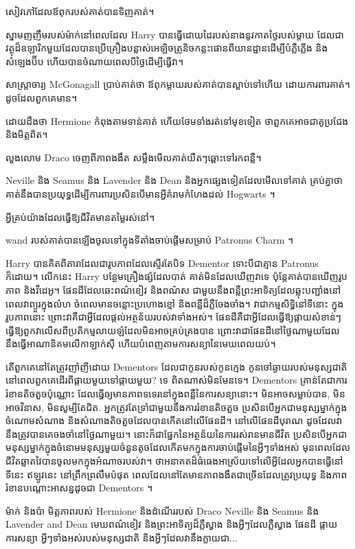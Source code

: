 {សៀវភៅដែលឪពុករបស់គាត់បានទិញគាត់។

ស្នាមញញឹមរបស់ម៉ាក់នៅពេលដែល Harry បានធ្វើដោយដៃរបស់នាងនូវកាតថ្ងៃរបស់ម្តាយ ដែលជាវត្ថុដ៏ឧឡារិកមួយដែលបានប្រើគ្រឿងបន្លាស់អេឡិចត្រូនិចកន្លះផោនពីយានដ្ឋានដើម្បីបំភ្លឺភ្លើង និងសំឡេងប៊ីប ហើយបានចំណាយពេលបីថ្ងៃដើម្បីធ្វើវា។

សាស្ត្រាចារ្យ McGonagall ប្រាប់គាត់ថា ឪពុកម្តាយរបស់គាត់បានស្លាប់ទៅហើយ ដោយការពារគាត់។ ដូចដែលពួកគេមាន។

ដោយដឹងថា Hermione កំពុងតាមទាន់គាត់ ហើយថែមទាំងរត់ទៅមុខទៀត ថាពួកគេអាចជាគូប្រជែង និងមិត្តពិត។

លួងលោម Draco ចេញពីភាពងងឹត សម្លឹងមើលគាត់យឺតៗឆ្ពោះទៅរកពន្លឺ។

Neville និង Seamus និង Lavender និង Dean និងអ្នកផ្សេងទៀតដែលមើលទៅគាត់ គ្រប់គ្នាថាគាត់នឹងបានប្រយុទ្ធដើម្បីការពារប្រសិនបើមានអ្វីគំរាមកំហែងដល់ Hogwarts ។

អ្វីគ្រប់យ៉ាងដែលធ្វើឱ្យជីវិតមានតម្លៃរស់នៅ។

wand របស់គាត់បានឡើងចូលទៅក្នុងទីតាំងចាប់ផ្តើមសម្រាប់ Patronus Charm ។

Harry បានគិតពីតារាដែលជារូបភាពដែលស្ទើរតែបិទ Dementor ទោះបីជាគ្មាន Patronus ក៏ដោយ។ លើកនេះ Harry បន្ថែមគ្រឿងផ្សំដែលបាត់ គាត់មិនដែលឃើញវាទេ ប៉ុន្តែគាត់បានឃើញរូបភាព និងវីដេអូ។ ផែនដីដែលឆេះពណ៌ខៀវ និងពណ៌ស ជាមួយនឹងពន្លឺព្រះអាទិត្យដែលឆ្លុះបញ្ជាំងនៅពេលវាព្យួរក្នុងលំហ ចំពេលមានចន្លោះប្រហោងខ្មៅ និងពន្លឺដ៏ភ្លឺចែងចាំង។ វាជាកម្មសិទ្ធិនៅទីនោះ ក្នុងរូបភាពនោះ ព្រោះវាគឺជាអ្វីដែលផ្តល់អត្ថន័យរបស់វាទាំងអស់។ ផែនដីគឺជាអ្វីដែលធ្វើឱ្យផ្កាយសំខាន់ៗ ធ្វើឱ្យពួកវាលើសពីប្រតិកម្មលាយឡំដែលមិនអាចគ្រប់គ្រងបាន ព្រោះវាជាផែនដីនៅថ្ងៃណាមួយដែលនឹងធ្វើអាណានិគមលើកាឡាក់ស៊ី ហើយបំពេញតាមការសន្យានៃមេឃពេលយប់។

តើពួកគេនៅតែត្រូវញាំញីដោយ Dementors ដែលជាកូនរបស់កូនក្មេង កូនចៅឆ្ងាយរបស់មនុស្សជាតិ នៅពេលពួកគេដើរពីផ្កាយមួយទៅផ្កាយមួយ? ទេ ពិតណាស់មិនមែនទេ។ Dementors គ្រាន់តែជាការរំខានតិចតួចប៉ុណ្ណោះ ដែលធ្វើឲ្យមានភាពទទេរនៅក្នុងពន្លឺនៃការសន្យានោះ។ មិន​អាច​សម្លាប់​បាន, មិន​អាច​វិនាស, មិន​សូម្បី​តែ​ជិត. អ្នកត្រូវតែទ្រាំជាមួយនឹងការរំខានតិចតួច ប្រសិនបើអ្នកជាមនុស្សម្នាក់ក្នុងចំណោមសំណាង និងសំណាងតិចតួចដែលបានកើតនៅលើផែនដី។ នៅលើផែនដីបុរាណ ដូចដែលវានឹងត្រូវបានគេចងចាំនៅថ្ងៃណាមួយ។ នោះក៏ជាផ្នែកនៃអត្ថន័យនៃការរស់រានមានជីវិត ប្រសិនបើអ្នកជាមនុស្សម្នាក់ក្នុងចំនោមមនុស្សមួយចំនួនតូចដែលកើតមកក្នុងការចាប់ផ្តើមនៃអ្វីៗទាំងអស់ មុនពេលដែលជីវិតឆ្លាតវៃបានចូលមកក្នុងអំណាចរបស់វា។ ថាអនាគតដ៏ធំធេងអាស្រ័យទៅលើអ្វីដែលអ្នកបានធ្វើនៅទីនេះ ឥឡូវនេះ នៅព្រឹកព្រលឹមបំផុត ពេលដែលនៅតែមានភាពងងឹតជាច្រើនដែលត្រូវប្រយុទ្ធ និងភាពរំខានបណ្តោះអាសន្នដូចជា Dementors ។

ម៉ាក់ និងប៉ា មិត្តភាពរបស់ Hermione និងដំណើររបស់ Draco Neville និង Seamus និង Lavender and Dean មេឃពណ៌ខៀវ និងព្រះអាទិត្យដ៏ភ្លឺស្វាង និងអ្វីៗដែលភ្លឺស្វាង ផែនដី ផ្កាយ ការសន្យា អ្វីៗទាំងអស់របស់មនុស្សជាតិ និងអ្វីៗដែលវានឹងក្លាយជា...

}
